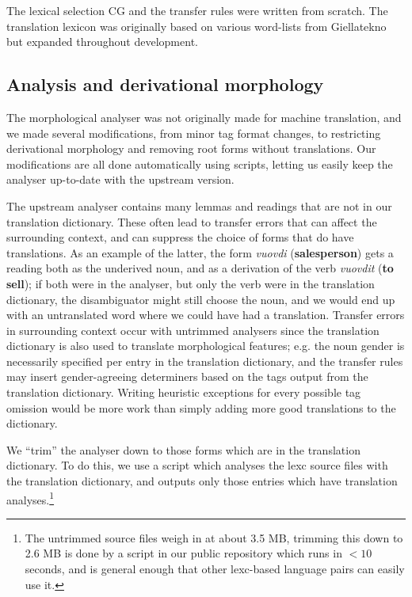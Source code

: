 \documentclass{book}
\begin{document}
The lexical selection CG and the transfer rules were written from
scratch. The translation lexicon was originally based on various
word-lists from Giellatekno but expanded throughout development.

\subsection{Analysis and derivational morphology}
The morphological analyser was not originally made for machine
translation, and we made several modifications, from minor tag format
changes, to restricting derivational morphology and removing root
forms without translations. Our modifications are all done
automatically using scripts, letting us easily keep the analyser
up-to-date with the upstream version.

The upstream analyser contains many lemmas and readings that are not
in our translation dictionary. These often lead to transfer errors
that can affect the surrounding context, and can suppress the choice
of forms that do have translations. As an example of the latter, the
form \textit{vuovdi} (\textbf{salesperson}) gets a reading both as the
underived noun, and as a derivation of the verb \textit{vuovdit}
(\textbf{to sell}); if both were in the analyser, but only the verb
were in the translation dictionary, the disambiguator might still
choose the noun, and we would end up with an untranslated word where
we could have had a translation. Transfer errors in surrounding
context occur with untrimmed analysers since the translation
dictionary is also used to translate morphological features; e.g. the
\nob{} noun gender is necessarily specified per entry in the
translation dictionary, and the transfer rules may insert
gender-agreeing determiners based on the tags output from the
translation dictionary. Writing heuristic exceptions for every
possible tag omission would be more work than simply adding more good
translations to the dictionary.

We ``trim'' the analyser down to those forms which are in the
translation dictionary. To do this, we use a script which analyses the
lexc source files with the translation dictionary, and outputs only
those entries which have translation analyses.\footnote{The untrimmed
  source files weigh in at about 3.5 MB, trimming this down to 2.6 MB
  is done by a script in our public repository which runs in $<10$
  seconds, and is general enough that other lexc-based language pairs
  can easily use it.}
\end{document}
